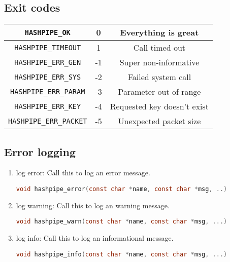 \documentclass[12pt]{article}
\def\clst{\lstinline[basicstyle=\ttfamily,breaklines=true,language=C]}
\begin{document}
\subsection{Exit codes}
\vspace{1cm}
\begin{center}
\begin{tabular}{|c|c|c|}
\hline
{\tt HASHPIPE\_OK}          &  0 & Everything is great\\[0.25cm] 
\hline
{\tt HASHPIPE\_TIMEOUT}     &  1 & Call timed out \\[0.25cm]
\hline
{\tt HASHPIPE\_ERR\_GEN}    & -1 & Super non-informative \\[0.25cm]
\hline
{\tt HASHPIPE\_ERR\_SYS}    & -2 & Failed system call \\[0.25cm]
\hline
{\tt HASHPIPE\_ERR\_PARAM}  & -3 & Parameter out of range \\[0.25cm]
\hline
{\tt HASHPIPE\_ERR\_KEY}    & -4 & Requested key doesn't exist \\[0.25cm]
\hline
{\tt HASHPIPE\_ERR\_PACKET} & -5 & Unexpected packet size \\[0.25cm]
\hline
\end{tabular}
\end{center}

\subsection{Error logging}

\begin{enumerate}
\item log error: Call this to log an error message.

\clst{void hashpipe_error(const char *name, const char *msg, ..)}

\item log warning: Call this to log an warning message.

\clst{void hashpipe_warn(const char *name, const char *msg, ...)}

\item log info: Call this to log an informational message.

\clst{void hashpipe_info(const char *name, const char *msg, ...)}

\end{enumerate}
\end{document}
